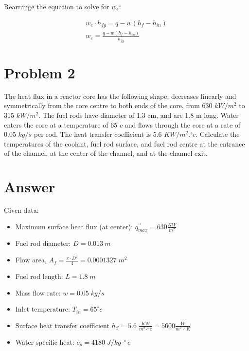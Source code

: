 \documentclass[12pt]{article}
\begin{document}
Rearrange the equation to solve for $w_e$:
\begin{tcolorbox}
    \begin{equation}
\begin{gathered}
    w_e \cdot h_{fg} = q - w(h_f - h_{in}) \\
    w_{e}={\frac{q-w(h_{f}-h_{i n})}{h_{f g}}}
\end{gathered}
\end{equation}
\end{tcolorbox}

\section*{Problem 2}

The heat flux in a reactor core has the following shape: decreases linearly and symmetrically  from the core centre to both ends of the core, from 630 $kW/m^2$ to 315 $kW/m^2$. The fuel rods  have diameter of 1.3 cm, and are 1.8 m long. Water enters the core at a temperature of 65$^{\circ}c$ and flows through the core at a rate of 0.05 $kg/s$ per rod. The heat transfer coefficient is 5.6 $KW / m^2.^{\circ}c$. Calculate the temperatures of the coolant, fuel rod surface, and fuel rod centre at  the entrance of the channel, at the center of the channel, and at the channel exit.

\section*{Answer}

Given data:
\begin{itemize}
    \item Maximum surface heat flux (at center): $q^{\prime \prime}_{max} = 630 \frac{KW}{m^2}$
    \item Fuel rod diameter: $D = 0.013 \: m$
    \item Flow area, $A_f = \frac{\pi \cdot D^2}{4} = 0.0001327 \; m^2$
    \item Fuel rod length: $L = 1.8 \; m$
    \item Mass flow rate: $w = 0.05 \; kg/s$
    \item Inlet temperature: $T_{in} = 65^{\circ} c$
    \item Surface heat transfer coefficient $h_S = 5.6 \; \frac{KW}{m^2 \cdot ^{\circ} c} = 5600 \frac{W}{m^2 \cdot ^{\circ} K}$
    \item Water specific heat: $c_p = 4180 \; J/kg \cdot ^{\circ} c$
\end{itemize}
\end{document}
